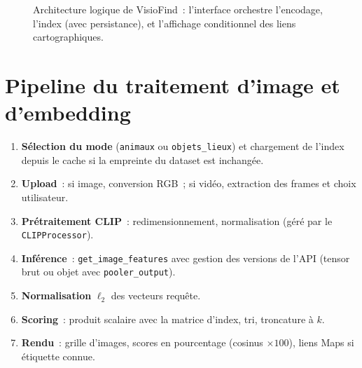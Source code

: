 \documentclass[11pt,a4paper,openany]{report}
\begin{document}
\begin{figure}[htbp]
  \centering
  \caption{Architecture logique de VisioFind~: l'interface orchestre l'encodage, l'index (avec persistance), et l'affichage conditionnel des liens cartographiques.}
  \label{fig:arch}
\end{figure}

\section{Pipeline du traitement d'image et d'embedding}

\begin{enumerate}[leftmargin=*]
  \item \textbf{Sélection du mode} (\texttt{animaux} ou \texttt{objets\_lieux}) et chargement de l'index depuis le cache si la empreinte du dataset est inchangée.
  \item \textbf{Upload}~: si image, conversion RGB~; si vidéo, extraction des frames et choix utilisateur.
  \item \textbf{Prétraitement CLIP}~: redimensionnement, normalisation (géré par le \texttt{CLIPProcessor}).
  \item \textbf{Inférence}~: \texttt{get\_image\_features} avec gestion des versions de l'API (tensor brut ou objet avec \texttt{pooler\_output}).
  \item \textbf{Normalisation} $\ell_2$ des vecteurs requête.
  \item \textbf{Scoring}~: produit scalaire avec la matrice d'index, tri, troncature à $k$.
  \item \textbf{Rendu}~: grille d'images, scores en pourcentage (cosinus $\times 100$), liens Maps si étiquette connue.
\end{enumerate}
\end{document}

